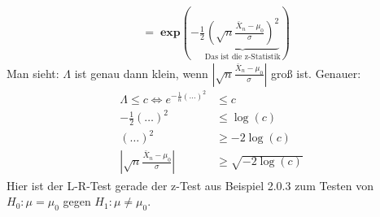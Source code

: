 \documentclass[10pt]{article}
\newenvironment{BSP}[1][]
{\begin{Beispiel}[frametitle=#1]}{\end{Beispiel}}
\begin{document}
\begin{BSP}[Beispiel 2.1.1 (z-Test mit zweiseitiger Alternative)]
\begin{equation*}
\begin{split}
			&= \; \textbf{exp} \left(- \frac{1}{2} \underbrace{\left(\sqrt{n} \frac{\bar{X}_n - \mu_0}{\sigma}\right)^2}_{\text{Das ist die z-Statistik}}\right)
		\end{split}
		\end{equation*}
		Man sieht: $\Lambda$ ist genau dann klein, wenn $\left\vert \sqrt{n} \frac{\bar{X}_n - \mu_0}{\sigma} \right\vert$ groß ist. Genauer:
		\begin{equation*}
			\begin{split}
				\Lambda \leq c \Leftrightarrow e^{- \frac{1}{n} (\ldots)^2} &\leq c\\
				-\frac{1}{2}(\ldots)^2 &\leq \log(c)\\
				(\ldots)^2 &\geq -2 \log(c)\\
				\left\vert \sqrt{n} \frac{\bar{X}_n - \mu_0}{\sigma} \right\vert &\geq \sqrt{-2 \log(c)}
			\end{split} 
		\end{equation*}
		Hier ist der L-R-Test gerade der z-Test aus Beispiel 2.0.3 zum Testen von $H_0: \mu = \mu_0$ gegen $H_1: \mu \neq \mu_0$. 
	\end{BSP}
	
\end{document}
